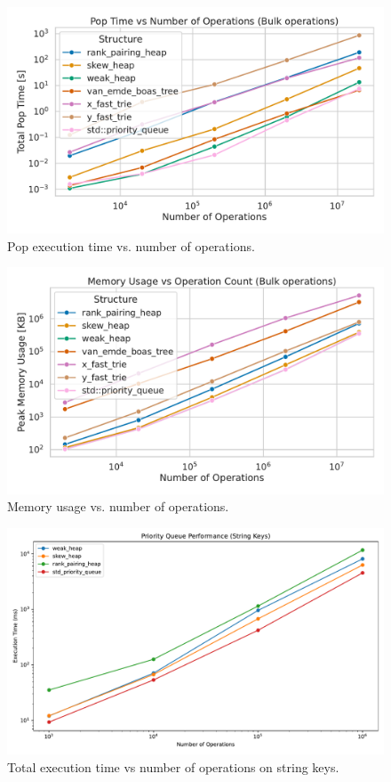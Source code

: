 \begin{figure}[H]
    \centering
    \includegraphics[width=1.0\textwidth]{figures/plots/plot_bulk_pop.pdf}
    \caption{Pop execution time vs. number of operations.}
    \label{fig:execution_time}
\end{figure}

\begin{figure}[H]
    \centering
    \includegraphics[width=1.0\textwidth]{figures/plots/plot_bulk_memory.pdf}
    \caption{Memory usage vs. number of operations.}
    \label{fig:execution_time}
\end{figure}

\begin{figure}[H]
    \centering
    \includegraphics[width=1.0\textwidth]{figures/plots/plot_string_performance.pdf}
    \caption{Total execution time vs number of operations on string keys.}
    \label{fig:execution_time}
\end{figure}

